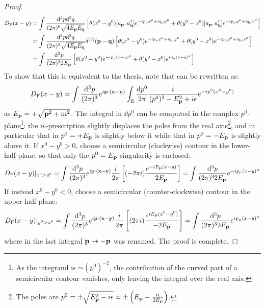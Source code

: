 \begin{proofbox}
\begin{proof}
    \begin{equation*}
      \begin{split}
        D_\text{F}(x-y)
        & = \int \frac{\mathrm{d}^3p \mathrm{d}^3q}{(2\pi)^6 \sqrt{4E_{\mathbf{p}}E_{\mathbf{q}}}} \left[ \theta(x^0 - y^0) [a_{\mathbf{p}} , a^\dagger_{\mathbf{q}}] e^{-i p_\mu x^\mu + i q_\mu y^\mu} + \theta(y^0 - x^0) [a_{\mathbf{p}} , a^\dagger_{\mathbf{q}}] e^{-i p_\mu y^\mu + i q_\mu x^\mu} \right] \\
        & = \int \frac{\mathrm{d}^3p \mathrm{d}^3q}{(2\pi)^3 \sqrt{4E_{\mathbf{p}}E_{\mathbf{q}}}} \delta^{(3)}(\mathbf{p} - \mathbf{q}) \left[ \theta(x^0 - y^0) e^{-i p_\mu x^\mu + i q_\mu y^\mu} + \theta(y^0 - x^0) e^{-i p_\mu y^\mu + i q_\mu x^\mu} \right] \\
        & = \int \frac{\mathrm{d}^3p}{(2\pi)^3 2E_{\mathbf{p}}} \left[ \theta(x^0 - y^0) e^{-i p_\mu (x-y)^\mu} + \theta(y^0 - x^0) e^{i p_\mu (x-y)^\mu} \right]
      \end{split}
    \end{equation*}
    To show that this is equivalent to the thesis, note that  can be rewritten as:
    \begin{equation*}
      D_\text{F}(x-y) = \int \frac{\mathrm{d}^3p}{(2\pi)^3} e^{i \mathbf{p} \cdot (\mathbf{x} - \mathbf{y})} \int_{\mathbb{R}} \frac{\mathrm{d} p^0}{2\pi} \frac{i}{(p^0)^2 - E_{\mathbf{p}}^2 + i\epsilon} e^{-i p^0 (x^0 - y^0)}
    \end{equation*}
    as $ E_{\mathbf{p}} = + \sqrt{\mathbf{p}^2 + m^2} $. The integral in $ \dd p^0 $ can be computed in the complex $ p^0 $-plane\footnote{As the integrand is $ \sim (p^0)^{-2} $, the contribution of the curved part of a semicircular contour vanishes, only leaving the integral over the real axis.}: the $ i\epsilon $-prescription slightly displaces the poles from the real axis\footnote{The poles are $ p^0 = \pm \sqrt{E_{\mathbf{p}}^2 - i\epsilon} \simeq \pm \left( E_{\mathbf{p}} - \frac{i\epsilon}{2E_{\mathbf{p}}} \right) $.}, and in particular that in $ p^0 = + E_{\mathbf{p}} $ is slightly below it while that in $ p^0 = - E_{\mathbf{p}} $ is slightly above it. If $ x^0 - y^0 > 0 $, choose a semicircular (clockwise) contour in the lower-half plane, so that only the $ p^0 = E_{\mathbf{p}} $ singularity is enclosed:
    \begin{equation*}
      D_\text{F}(x-y)\vert_{x^0 > y^0} = \int \frac{\mathrm{d}^3p}{(2\pi)^3} e^{i \mathbf{p} \cdot (\mathbf{x} - \mathbf{y})} \frac{i}{2\pi} \left[ (-2\pi i) \frac{e^{-i E_{\mathbf{p}} (x-y)}}{2E_{\mathbf{p}}} \right] = \int \frac{\mathrm{d}^3p}{(2\pi)^3 2E_{\mathbf{p}}} e^{-i p_\mu (x-y)^\mu}
    \end{equation*}
    If instead $ x^0 - y^0 < 0 $, choose a semicircular (counter-clockwise) contour in the upper-half plane:
    \begin{equation*}
      D_\text{F}(x-y)\vert_{y^0 > x^0} = \int \frac{\mathrm{d}^3p}{(2\pi)^3} e^{i \mathbf{p} \cdot (\mathbf{x} - \mathbf{y})} \frac{i}{2\pi} \left[ (2\pi i) \frac{e^{i E_{\mathbf{p}} (x^0 - y^0)}}{-2E_{\mathbf{p}}} \right] = \int \frac{\mathrm{d}^3p}{(2\pi)^3 2E_{\mathbf{p}}} e^{i p_\mu (x-y)^\mu}
    \end{equation*}
    where in the last integral $ \mathbf{p} \rightarrow -\mathbf{p} $ was renamed. The proof is complete.
  \end{proof}
\end{proofbox}

